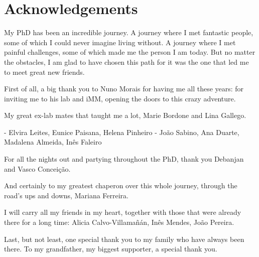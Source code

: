 
\chapter*{Acknowledgements}
My PhD has been an incredible journey. A journey where I met fantastic people, some of which I could never imagine living without. A journey where I met painful challenges, some of which made me the person I am today. But no matter the obstacles, I am glad to have chosen this path for it was the one that led me to meet great new friends.

First of all, a big thank you to Nuno Morais for having me all these years: for inviting me to his lab and iMM, opening the doors to this crazy adventure.

My great ex-lab mates that taught me a lot, Marie Bordone and Lina Gallego.

- Elvira Leites, Eunice Paisana, Helena Pinheiro
- João Sabino, Ana Duarte, Madalena Almeida, Inês Faleiro

For all the nights out and partying throughout the PhD, thank you Debanjan and Vasco Conceição.

And certainly to my greatest chaperon over this whole journey, through the road's ups and downs, Mariana Ferreira.

I will carry all my friends in my heart, together with those that were already there for a long time: Alicia Calvo-Villamañán, Inês Mendes, João Pereira.

Last, but not least, one special thank you to my family who have always been there. To my grandfather, my biggest supporter, a special thank you.